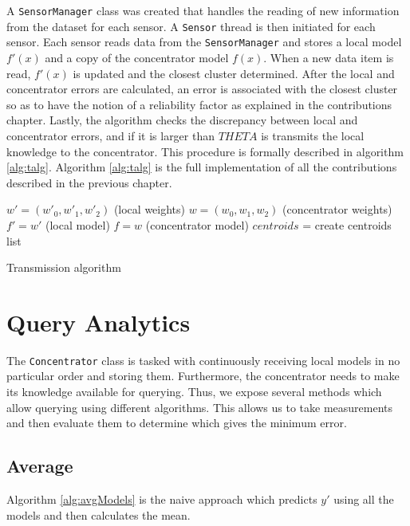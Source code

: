 \documentclass{mproj}
\begin{document}
A \texttt{SensorManager} class was created that handles the reading of new information from the dataset for each sensor. A \texttt{Sensor} thread is then initiated for each sensor. Each sensor reads data from the \texttt{SensorManager} and stores a local model $f'(x)$ and a copy of the concentrator model $f(x)$. When a new data item is read, $f'(x)$ is updated and the closest cluster determined. After the local and concentrator errors are calculated, an error is associated with the closest cluster so as to have the notion of a reliability factor as explained in the contributions chapter. Lastly, the algorithm checks the discrepancy between local and concentrator errors, and if it is larger than $THETA$ is transmits the local knowledge to the concentrator. This procedure is formally described in algorithm \ref{alg:talg}. Algorithm \ref{alg:talg} is the full implementation of all the contributions described in the previous chapter. 

\begin{algorithm}[H]
$w'=(w'_0,w'_1,w'_2)$ (local weights)\;
$w=(w_0,w_1,w_2)$ (concentrator weights)\;
$f' = w'$ (local model)\;
$f = w$ (concentrator model)\;
$centroids$ = create centroids list\;
 \caption{Transmission algorithm}
 \label{alg:talg}
\end{algorithm}

\section{Query Analytics}
\label{sec:queryAnalytics}
The \texttt{Concentrator} class is tasked with continuously receiving local models in no particular order and storing them. Furthermore, the concentrator needs to make its knowledge available for querying. Thus, we expose several methods which allow querying using different algorithms. This allows us to take measurements and then evaluate them to determine which gives the minimum error. 

\subsection{Average}
Algorithm \ref{alg:avgModels} is the naive approach which predicts $y'$ using all the models and then calculates the mean.
\end{document}
